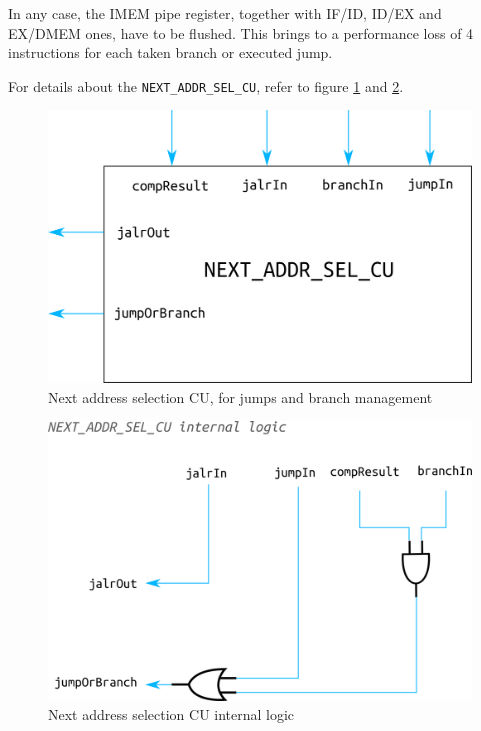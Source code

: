 \documentclass[a4paper]{article}
\begin{document}
In any case, the IMEM pipe register, together with IF/ID, ID/EX and EX/DMEM ones, have to be flushed. This brings to a performance loss of 4 instructions for each taken branch or executed jump.

For details about the \texttt{NEXT\_ADDR\_SEL\_CU}, refer to figure \ref{fig:next_addr_sel_cu} and \ref{fig:next_addr_sel_cu_internalLogic}.

\begin{figure}[hbtp]
    \centering
    \includegraphics[scale=0.5]{../next_addr_sel_cu/ref/schematic/next_addr_sel_cu.png}
    \caption{Next address selection CU, for jumps and branch management}
    \label{fig:next_addr_sel_cu}
\end{figure}

\begin{figure}[hbtp]
    \centering
    \includegraphics[scale=0.4]{../next_addr_sel_cu/ref/schematic/next_addr_sel_cu_internalLogic.png}
    \caption{Next address selection CU internal logic}
    \label{fig:next_addr_sel_cu_internalLogic}
\end{figure}
\end{document}
